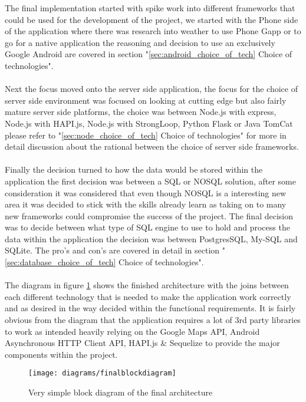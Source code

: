 \noindent
The final implementation started with spike work into different frameworks that could be used for the development of the project, we started with the Phone side of the application where there was research into weather to use Phone Gapp or to go for a native application the reasoning and decision to use an exclusively Google Android are covered in section "\ref{sec:android_choice_of_tech} Choice of technologies".\\
\\
Next the focus moved onto the server side application, the focus for the choice of server side environment was focused on looking at cutting edge but also fairly mature server side platforms, the choice was between Node.js with express, Node.js with HAPI.js, Node.js with StrongLoop, Python Flask or Java TomCat please refer to "\ref{sec:node_choice_of_tech} Choice of technologies" for more in detail discussion about the rational between the choice of server side frameworks.\\
\\
Finally the decision turned to how the data would be stored within the application the first decision was between a SQL or NOSQL solution, after some consideration it was considered that even though NOSQL is a interesting new area it was decided to stick with the skills already learn as taking on to many new frameworks could compromise the success of the project. The final decision was to decide between what type of SQL engine to use to hold and process the data within the application the decision was between PostgresSQL, My-SQL and SQLite. The pro's and con's are covered in detail in section "\ref{sec:database_choice_of_tech} Choice of technologies".\\
\\
The diagram in figure \ref{fig:final_block_diagram_image} shows the finished architecture with the joins between each different technology that is needed to make the application work correctly and as desired in the way decided within the functional requirements. It is fairly obvious from the diagram that the application requires a lot of 3rd party libraries to work as intended heavily relying on the Google Maps API, Android Asynchronous HTTP Client API, HAPI.js \& Sequelize to provide the major components within the project.\\

\begin{figure}[H]
    \centering
    \texttt{[image: diagrams/finalblockdiagram]}
    \caption{Very simple block diagram of the final architecture}
    \label{fig:final_block_diagram_image}
\end{figure}

